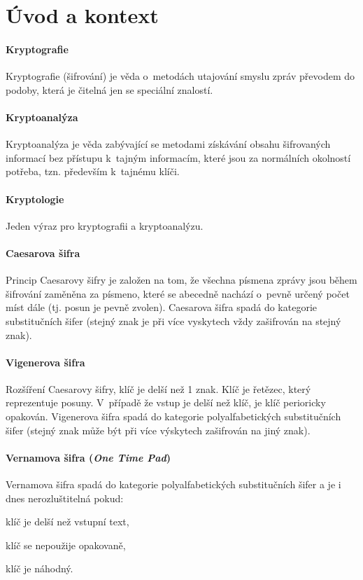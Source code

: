 \section{Úvod a kontext}

\paragraph*{Kryptografie} Kryptografie (šifrování) je věda o~metodách utajování smyslu zpráv převodem do podoby, která je čitelná jen se speciální znalostí.

\paragraph*{Kryptoanalýza} Kryptoanalýza je věda zabývající se metodami získávání obsahu šifrovaných informací bez přístupu k~tajným informacím, které jsou za normálních okolností potřeba, tzn. především k~tajnému klíči.

\paragraph*{Kryptologie} Jeden výraz pro kryptografii a kryptoanalýzu.

\paragraph*{Caesarova šifra} Princip Caesarovy šifry je založen na tom, že všechna písmena zprávy jsou během šifrování zaměněna za písmeno, které se abecedně nachází o~pevně určený počet míst dále (tj. posun je pevně zvolen). Caesarova šifra spadá do kategorie substitučních šifer (stejný znak je při více vyskytech vždy zašifrován na stejný znak).

\paragraph*{Vigenerova šifra} Rozšíření Caesarovy šifry, klíč je delší než 1 znak. Klíč je řetězec, který reprezentuje posuny. V~případě že vstup je delší než klíč, je klíč perioricky opakován. Vigenerova šifra spadá do kategorie polyalfabetických substitučních šifer (stejný znak může být při více výskytech zašifrován na jiný znak).

\paragraph*{Vernamova šifra (\textit{One Time Pad})} Vernamova šifra spadá do kategorie polyalfabetických substitučních šifer a je i dnes nerozluštitelná pokud: \begin{compactitem}
    \item klíč je delší než vstupní text,
    \item klíč se nepoužije opakovaně,
    \item klíč je náhodný.
\end{compactitem}

